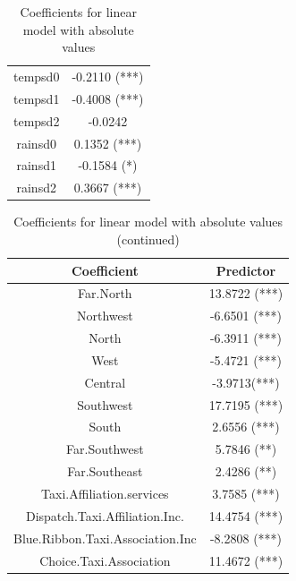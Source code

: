 \documentclass[twoside,11pt]{article}
\begin{document}
\begin{table}[H]
\begin{tabular}{c|c}
        tempsd0 & -0.2110 (***) \\
        tempsd1 & -0.4008 (***) \\
        tempsd2 & -0.0242 \\
        rainsd0 & 0.1352 (***) \\
        rainsd1 & -0.1584 (*) \\
        rainsd2 & 0.3667 (***) \\
    \end{tabular}
    \caption{Coefficients for linear model with absolute values}
    \label{tab:coefficients_abs}
\end{table}

\begin{table}[H]
    \centering
    \begin{tabular}{c|c}
        Coefficient & Predictor \\ 
        \hline
        \hline
        Far.North & 13.8722 (***) \\
        Northwest & -6.6501 (***) \\
        North  & -6.3911 (***) \\
        West & -5.4721 (***) \\
        Central & -3.9713(***) \\
        Southwest & 17.7195 (***) \\
        South & 2.6556 (***) \\
        Far.Southwest & 5.7846 (**) \\
        Far.Southeast & 2.4286 (**) \\
        Taxi.Affiliation.services & 3.7585 (***) \\
        Dispatch.Taxi.Affiliation.Inc. & 14.4754 (***) \\
        Blue.Ribbon.Taxi.Association.Inc & -8.2808 (***) \\
        Choice.Taxi.Association & 11.4672 (***) \\
    \end{tabular}
    \caption{Coefficients for linear model with absolute values (continued)}
    \label{tab:coefficients_abs2}
\end{table}
\end{document}
